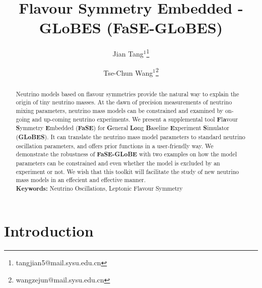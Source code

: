 \documentclass[aps,prd,nofootinbib,preprint]{revtex4}
\begin{document}
 
\title{Flavour Symmetry Embedded - GLoBES (FaSE-GLoBES)} %
\author{Jian Tang$^1$\footnote{tangjian5@mail.sysu.edu.cn}}
\author{Tse-Chun Wang$^1$\footnote{wangzejun@mail.sysu.edu.cn}}

\begin{abstract}
Neutrino models based on flavour symmetries provide the natural way to explain the origin of tiny neutrino masses. At the dawn of precision measurements of neutrino mixing parameters, neutrino mass models can be constrained and examined by on-going and up-coming neutrino experiments. We present a supplemental tool \textbf{F}l\textbf{a}vour \textbf{S}ymmetry \textbf{E}mbedded (\textbf{FaSE}) for \textbf{G}eneral \textbf{Lo}ng \textbf{B}aseline \textbf{E}xperiment \textbf{S}imulator (\textbf{GLoBES}). It can translate the neutrino mass model {\color{blue}parameters} to standard neutrino oscillation parameters, and offers prior functions in a user-friendly way. We demonstrate the robustness of \textbf{FaSE-GLoBE} with two examples on how the model parameters can be constrained and even whether the model is excluded by an experiment or not. We wish that this toolkit will facilitate the study of new neutrino mass models in an effecient and effective manner.\\
\textbf{Keywords:} Neutrino Oscillations, Leptonic Flavour Symmetry 
\end{abstract} 

\maketitle

\section{Introduction}\label{sec:intro}
\end{document}
